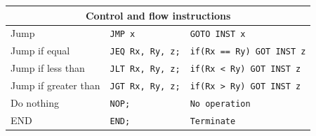 \documentclass[a4paper, english]{article}
\numberwithin{equation}{section}
\begin{document}
\begin{table}[H]
\begin{tabular}{lll}
        \midrule
        \multicolumn{3}{c}{Control and flow instructions}                                   \\
        \midrule
        Jump                  & \texttt{JMP x}           & \texttt{GOTO INST x}             \\
        Jump if equal         & \texttt{JEQ Rx, Ry, z;}  & \texttt{if(Rx == Ry) GOT INST z} \\
        Jump if less than     & \texttt{JLT Rx, Ry, z;}  & \texttt{if(Rx < Ry) GOT INST z}  \\
        Jump if greater than  & \texttt{JGT Rx, Ry, z;}  & \texttt{if(Rx > Ry) GOT INST z}  \\
        Do nothing            & \texttt{NOP;}            & \texttt{No operation}            \\
        END                   & \texttt{END;}            & \texttt{Terminate}               \\
        \bottomrule
    \end{tabular}
\end{table}
\end{document}
